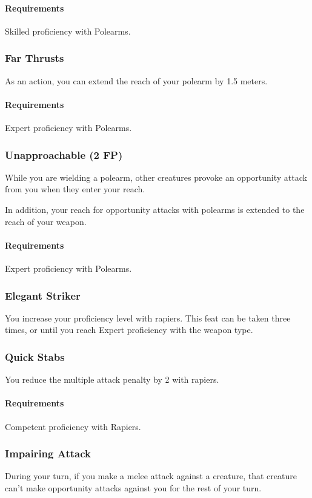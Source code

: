     \paragraph{Requirements} Skilled proficiency with Polearms.
\subsubsection{Far Thrusts} \label{feat::farthrusts}
    As an action, you can extend the reach of your polearm by 1.5 meters.
    \paragraph{Requirements} Expert proficiency with Polearms.
\subsubsection{Unapproachable (2 FP)} \label{feat::unapproachable}
    While you are wielding a polearm, other creatures provoke an opportunity attack from you when they enter your reach.

    In addition, your reach for opportunity attacks with polearms is extended to the reach of your weapon.
    \paragraph{Requirements} Expert proficiency with Polearms.
\subsubsection{Elegant Striker} \label{feat::elegantstriker}
    You increase your proficiency level with rapiers.
    This feat can be taken three times, or until you reach Expert proficiency with the weapon type.
\subsubsection{Quick Stabs} \label{feat::quickstabs}
    You reduce the multiple attack penalty by 2 with rapiers.
    \paragraph{Requirements} Competent proficiency with Rapiers.
\subsubsection{Impairing Attack} \label{feat::impairingattack}
    During your turn, if you make a melee attack against a creature, that creature can't make opportunity attacks against you for the rest of your turn.
